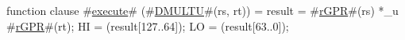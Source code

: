 function clause #\hyperref[zexecute]{execute}# (#\hyperref[zDMULTU]{DMULTU}#(rs, rt)) =
  {
    result = #\hyperref[zrGPR]{rGPR}#(rs) *_u #\hyperref[zrGPR]{rGPR}#(rt);
    HI = (result[127..64]);
    LO = (result[63..0]);
  }
